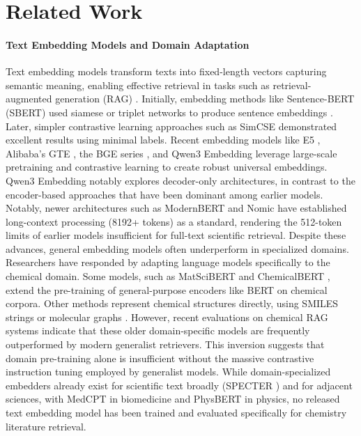 \documentclass[twoside,twocolumn,9pt]{article}
\begin{document}
\section{Related Work}
\paragraph*{Text Embedding Models and Domain Adaptation}
Text embedding models transform texts into fixed-length vectors capturing semantic meaning, enabling effective retrieval in tasks such as retrieval-augmented generation (RAG) \cite{wang2024multilingual}. Initially, embedding methods like Sentence-BERT (SBERT) used siamese or triplet networks to produce sentence embeddings \cite{reimers2019sentence}. Later, simpler contrastive learning approaches such as SimCSE \cite{gao2021simcse} demonstrated excellent results using minimal labels. Recent embedding models like E5 \cite{wang2022text}, Alibaba’s GTE \cite{li2023towards}, the BGE series \cite{chen2024bge}, and Qwen3 Embedding \cite{qwen3embedding} leverage large-scale pretraining and contrastive learning to create robust universal embeddings. Qwen3 Embedding notably explores decoder-only architectures, in contrast to the encoder-based approaches that have been dominant among earlier models. Notably, newer architectures such as ModernBERT \cite{warner2025smarter} and Nomic \cite{nussbaum2024nomic} have established long-context processing (8192+ tokens) as a standard, rendering the 512-token limits of earlier models insufficient for full-text scientific retrieval. Despite these advances, general embedding models often underperform in specialized domains. Researchers have responded by adapting language models specifically to the chemical domain. Some models, such as MatSciBERT \cite{gupta2022matscibert} and ChemicalBERT \cite{recobo_chemical_bert_uncased}, extend the pre-training of general-purpose encoders like BERT on chemical corpora. Other methods represent chemical structures directly, using SMILES strings \cite{wang2019smiles,zheng2024bert,chithrananda2020chemberta,ahmad2022chemberta} or molecular graphs \cite{rong2020self,liu2021pre}. However, recent evaluations on chemical RAG systems \cite{amiri2025chunk} indicate that these older domain-specific models are frequently outperformed by modern generalist retrievers. This inversion suggests that domain pre-training alone is insufficient without the massive contrastive instruction tuning employed by generalist models. While domain-specialized embedders already exist for scientific text broadly (SPECTER \cite{cohan2020specter}) and for adjacent sciences, with MedCPT \cite{jin2023medcpt} in biomedicine and PhysBERT \cite{hellert2024physbert} in physics, no released text embedding model has been trained and evaluated specifically for chemistry literature retrieval.
\end{document}
